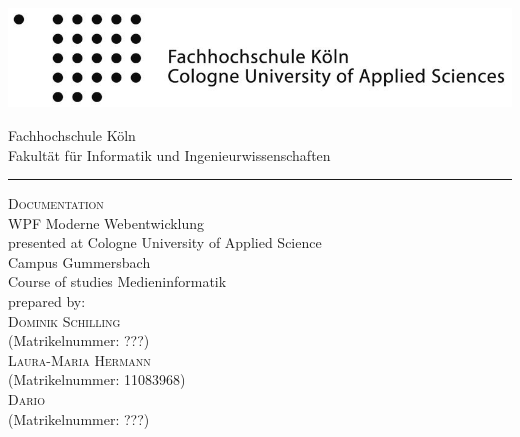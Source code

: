 \documentclass[a4paper,12pt,oneside]{article} %
\begin{document}
 
   
  \pagestyle{empty}
  
  
  \begin{titlepage}
    \includegraphics[scale=1.00]{Sources/logo_fhkoeln_sw}\\
    \begin{center}
      \Large
      Fachhochschule Köln\\
      Fakultät für Informatik und Ingenieurwissenschaften\\
      \hrule\par\rule{0pt}{2cm} %
      \LARGE
      \textsc{Documentation}\\
      \vspace{1cm} %
      \huge
      WPF Moderne Webentwicklung\\
      \Large
      \vspace{1.5cm}
      \large
      presented at Cologne University of Applied Science\\
      Campus Gummersbach\\
      Course of studies
      Medieninformatik\\ 
      \vspace{1.0cm}
      prepared by:\\
      \textsc{Dominik Schilling}\\
      (Matrikelnummer: ???)\\
      \textsc{Laura-Maria Hermann}\\
      (Matrikelnummer: 11083968)\\
      \textsc{Dario }\\
      (Matrikelnummer: ???)\\
      \vspace{1.5cm}
      \vspace{1.5cm}
     
    \end{center}    
  \end{titlepage}
  
  \newpage
 
  
  \tableofcontents
	\pagestyle{fancy}
   		
\end{document}
